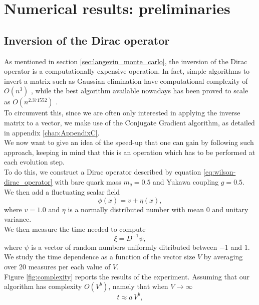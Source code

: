 \chapter{Numerical results: preliminaries}
\label{chapt:results_preliminary}

\section{Inversion of the Dirac operator}
\label{sec:inversion_dirac}
As mentioned in section \ref{sec:langevin_monte_carlo}, the inversion of the Dirac operator is a computationally expensive operation. In fact, simple algorithms to invert a matrix such as Gaussian elimination have computational complexity of $O(n^3)$ \cite{cond_num_ref}, while the best algorithm available nowadays has been proved to scale as $O(n^{2.371552})$ \cite{williams2023new}. \\
To circumvent this, since we are often only interested in applying the inverse matrix to a vector, we make use of the Conjugate Gradient algorithm, as detailed in appendix \ref{chap:AppendixC}. \\
We now want to give an idea of the speed-up that one can gain by following such approach, keeping in mind that this is an operation which has to be performed at each evolution step.  \\
To do this, we construct a Dirac operator described by equation \eqref{eq:wilson-dirac_operator} with bare quark mass $m_q = 0.5$ and Yukawa coupling $g=0.5$. We then add a fluctuating scalar field 
\begin{equation*} 
    \phi(x) = v + \eta(x),
\end{equation*} 
where $v = 1.0$ and $\eta$ is a normally distributed number with mean $0$ and unitary variance. \\
We then measure the time needed to compute 
\begin{equation*}
    \xi = D^{-1}\psi,
\end{equation*}
where $\psi$ is a vector of random numbers uniformly ditributed between $-1$ and $1$. We study the time dependence as a function of the vector size $V$ by averaging over 20 measures per each value of $V$. \\
Figure \ref{fig:complexity} reports the results of the experiment. Assuming that our algorithm has complexity $O(V^b)$, namely that when $V \to \infty$
\begin{equation*}
    t \approx a \, V^b,
\end{equation*}
